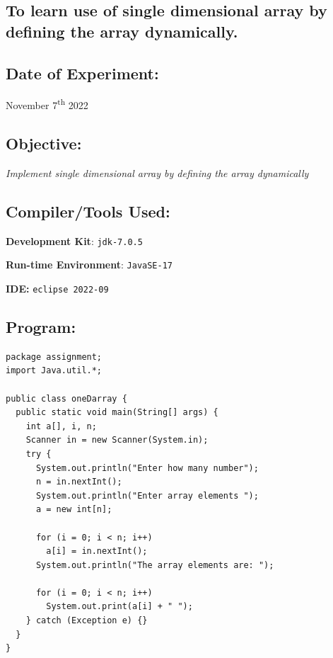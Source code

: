 \documentclass[12pt, a4paper]{article}
\begin{document}
\begin{tcolorbox}
\section{To learn use of single dimensional array by defining the array dynamically.}
\end{tcolorbox}

\subsection*{Date of Experiment:}
November 7\textsuperscript{th} 2022
\subsection*{Objective:}
\emph{\large{Implement single dimensional array by defining the array dynamically}}

\subsection*{Compiler/Tools Used:}
\textbf{Development Kit}: \verb+jdk-7.0.5+

\textbf{Run-time Environment}: \verb+JavaSE-17+

\textbf{IDE:} \verb+eclipse 2022-09+

\subsection*{Program:}
\begin{lstlisting}
package assignment;
import Java.util.*;

public class oneDarray {
  public static void main(String[] args) {
    int a[], i, n;
    Scanner in = new Scanner(System.in);
    try {
      System.out.println("Enter how many number");
      n = in.nextInt();
      System.out.println("Enter array elements ");
      a = new int[n];

      for (i = 0; i < n; i++)
        a[i] = in.nextInt();
      System.out.println("The array elements are: ");

      for (i = 0; i < n; i++)
        System.out.print(a[i] + " ");
    } catch (Exception e) {}
  }
}
\end{lstlisting}
\end{document}
